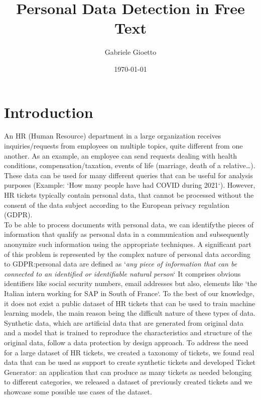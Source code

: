 \documentclass{article}
\title{Personal Data Detection in Free Text }
\author{Gabriele Gioetto}
\date{\today}
\begin{document}
\maketitle

    
    
    

\section{Introduction}
An HR (Human Resource) department in a large organization receives inquiries\slash requests from employees on multiple topics, quite different from one another. As an example, an employee can send requests dealing with health conditions, compensation/taxation, events of life (marriage, death of a relative\dots). \\
These data can be used for many different queries that can be useful for analysis purposes (Example: `How many people have had COVID during 2021`). However, HR tickets typically contain personal data, that cannot be processed without the consent of the data subject according to the European privacy regulation (GDPR). \\
To be able to process documents with personal data, we can identifythe pieces of information that qualify as personal data in a communication and subsequently anonymize such information using the appropriate techniques.
A significant part of this problem is represented by the complex nature of personal data according to GDPR:\@ personal data are defined as `\textit{any piece of information that can be connected to an identified or identifiable natural person}` It comprises obvious identifiers like social security numbers, email addresses but also, elements like `the Italian intern working for SAP in South of France`.
To the best of our knowledge, it does not exist a public dataset of HR tickets that can be used to train machine learning models, the main reason being the difficult nature of these types of data. Synthetic data, which are artificial data that are generated from original data and a model that is trained to reproduce the characteristics and structure of the original data, follow a data protection by design approach.
To address the need for a large dataset of HR tickets, we created a taxonomy of tickets, we found real data that can be used as support to create synthetic tickets and developed Ticket Generator: an application that can produce as many tickets as needed belonging to different categories, we released a dataset of previously created tickets and we showcase some possible use cases of the dataset.
\end{document}
